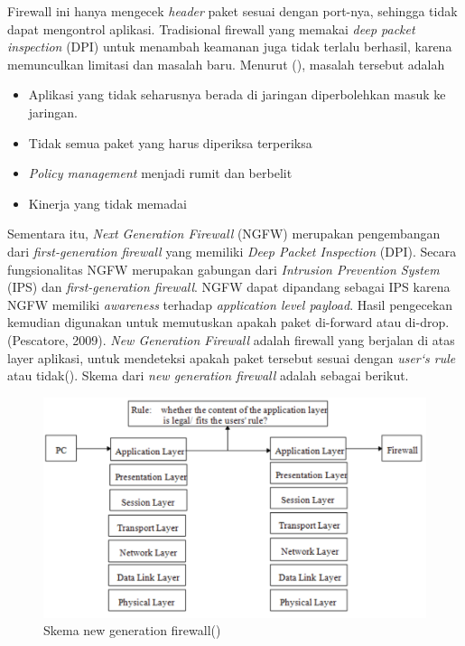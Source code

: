 Firewall ini hanya mengecek \textit{header} paket sesuai dengan port-nya, sehingga tidak dapat mengontrol aplikasi. Tradisional firewall yang memakai \textit{deep packet inspection} (DPI) untuk menambah keamanan juga tidak terlalu berhasil, karena memunculkan limitasi dan masalah baru. Menurut (\cite{miller2011next}), masalah tersebut adalah
\begin{itemize}
	\item Aplikasi yang tidak seharusnya berada di jaringan diperbolehkan masuk ke jaringan.
	\item Tidak semua paket yang harus diperiksa terperiksa
	\item \textit{Policy management} menjadi rumit dan berbelit
	\item Kinerja yang tidak memadai 
\end{itemize}

Sementara itu, \textit{Next Generation Firewall} (NGFW) merupakan pengembangan dari \textit{first-generation firewall} yang memiliki \textit{Deep Packet Inspection} (DPI). Secara fungsionalitas NGFW merupakan gabungan dari \textit{Intrusion Prevention System} (IPS) dan \textit{first-generation firewall}. NGFW dapat dipandang sebagai IPS karena NGFW memiliki \textit{awareness} terhadap \textit{application level payload}. Hasil pengecekan kemudian digunakan untuk memutuskan apakah paket di-forward atau di-drop. (Pescatore, 2009). \textit{New Generation Firewall} adalah firewall yang berjalan di atas layer aplikasi, untuk mendeteksi apakah paket tersebut sesuai dengan \textit{user`s rule} atau tidak(\cite{zhong2012design}). Skema dari \textit{new generation firewall} adalah sebagai berikut.
\begin{figure}[H]
	\centering
	\includegraphics[width=\textwidth]{resources/NGFW.png}
	\caption{Skema new generation firewall(\cite{zhong2012design})}
	\label{fig:new_generation_firewall}
\end{figure}


